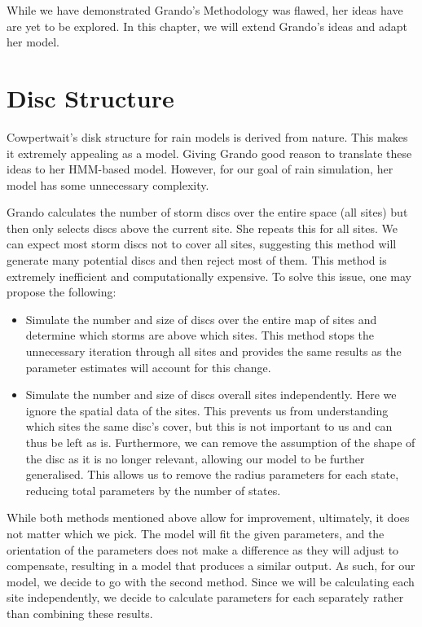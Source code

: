 While we have demonstrated Grando's Methodology was flawed, her ideas have are yet to be explored. In this chapter, we will extend Grando's ideas and adapt her model. 

\section{Disc Structure}
\label{Extending_HMM_Based_Rainfall_Models:Disc_Structure}
Cowpertwait's disk structure for rain models is derived from nature. This makes it extremely appealing as a model. Giving Grando good reason to translate these ideas to her HMM-based model. However, for our goal of rain simulation, her model has some unnecessary complexity. 

Grando calculates the number of storm discs over the entire space (all sites) but then only selects discs above the current site. She repeats this for all sites. We can expect most storm discs not to cover all sites, suggesting this method will generate many potential discs and then reject most of them. This method is extremely inefficient and computationally expensive. To solve this issue, one may propose the following:
\begin{itemize}
    \item Simulate the number and size of discs over the entire map of sites and determine which storms are above which sites. This method stops the unnecessary iteration through all sites and provides the same results as the parameter estimates will account for this change.
    \item Simulate the number and size of discs overall sites independently. Here we ignore the spatial data of the sites. This prevents us from understanding which sites the same disc's cover, but this is not important to us and can thus be left as is. Furthermore, we can remove the assumption of the shape of the disc as it is no longer relevant, allowing our model to be further generalised. This allows us to remove the radius parameters for each state, reducing total parameters by the number of states.
\end{itemize}

While both methods mentioned above allow for improvement, ultimately, it does not matter which we pick. The model will fit the given parameters, and the orientation of the parameters does not make a difference as they will adjust to compensate, resulting in a model that produces a similar output. As such, for our model, we decide to go with the second method. Since we will be calculating each site independently, we decide to calculate parameters for each separately rather than combining these results. 

